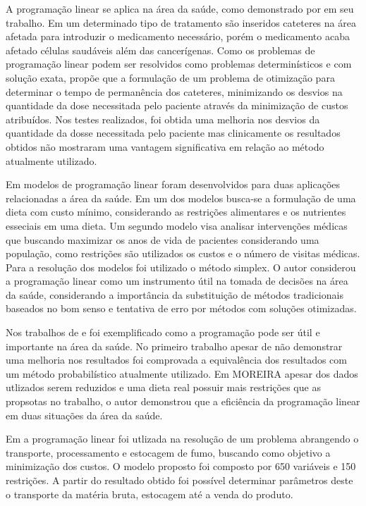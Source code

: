 A programação linear se aplica na área da saúde, como demonstrado por  em seu trabalho. Em um determinado tipo de tratamento são inseridos cateteres na área afetada para introduzir o medicamento necessário, porém o medicamento acaba afetado células saudáveis além das cancerígenas. Como os problemas de programação linear podem ser resolvidos como problemas determinísticos e com solução exata,  propõe que a formulação de um problema de otimização para determinar o tempo de permanência dos cateteres, minimizando os desvios na quantidade da dose necessitada pelo paciente através da minimização de custos atribuídos. Nos testes realizados, foi obtida uma melhoria nos desvios da quantidade da dosse necessitada pelo paciente mas clinicamente os resultados obtidos não mostraram uma vantagem significativa em relação ao método atualmente utilizado.

Em  modelos de programação linear foram desenvolvidos para duas aplicações relacionadas a área da saúde. Em um dos modelos busca-se a formulação de uma dieta com custo mínimo, considerando as restrições alimentares e os nutrientes esseciais em uma dieta. Um segundo modelo visa analisar intervenções médicas que buscando maximizar os anos de vida de pacientes considerando uma população, como restrições são utilizados os custos e o número de visitas médicas. Para a resolução dos modelos foi utilizado o método simplex. O autor considerou a programação linear como um instrumento útil na tomada de decisões na área da saúde, considerando a importância da substituição de métodos tradicionais baseados no bom senso e tentativa de erro por métodos com soluções otimizadas.

Nos trabalhos de  e  foi exemplificado como a programação pode ser útil e importante na área da saúde. No primeiro trabalho apesar de não demonstrar uma melhoria nos resultados foi comprovada a equivalência dos resultados com um método probabilístico atualmente utilizado. Em MOREIRA apesar dos dados utlizados serem reduzidos e uma dieta real possuir mais restrições que as propsotas no trabalho, o autor demonstrou que a eficiência da programação linear em duas situações da área da saúde.

Em  a programação linear foi utlizada na resolução de um problema abrangendo o transporte, processamento e estocagem de fumo, buscando como objetivo a minimização dos custos. O modelo proposto foi composto por 650 variáveis e 150 restrições. A partir do resultado obtido foi possível determinar parâmetros deste o transporte da matéria bruta, estocagem até a venda do produto.


